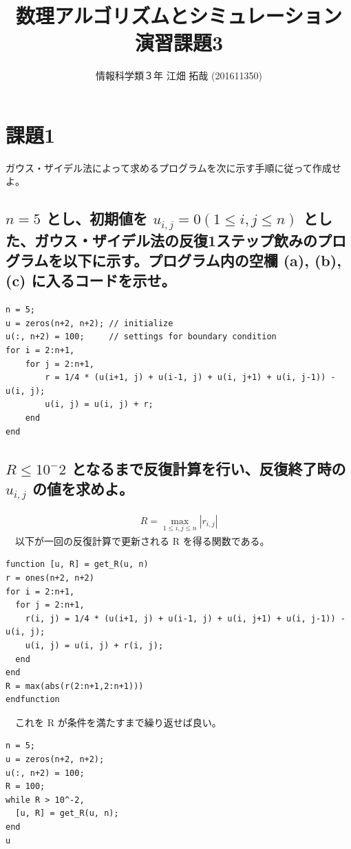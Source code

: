 \documentclass{scrartcl}
\author{情報科学類３年 江畑 拓哉 (201611350)}
\date{}
\title{数理アルゴリズムとシミュレーション\\\medskip
\large 演習課題3}
\begin{document}
\section{課題1}

\label{sec:org79d9556}
ガウス・ザイデル法によって求めるプログラムを次に示す手順に従って作成せよ。\\
\subsection{\(n = 5\) とし、初期値を \(u_{i, j} = 0(1 \leq i, j \leq n)\) とした、ガウス・ザイデル法の反復1ステップ飲みのプログラムを以下に示す。プログラム内の空欄 (a), (b), (c) に入るコードを示せ。}
\label{sec:orgfe8f55b}
\begin{verbatim}
n = 5;
u = zeros(n+2, n+2); // initialize
u(:, n+2) = 100;     // settings for boundary condition
for i = 2:n+1,
    for j = 2:n+1,
        r = 1/4 * (u(i+1, j) + u(i-1, j) + u(i, j+1) + u(i, j-1)) - u(i, j);
        u(i, j) = u(i, j) + r;
    end
end
\end{verbatim}
\subsection{\(R\leq 10^-2\) となるまで反復計算を行い、反復終了時の \(u_{i, j}\) の値を求めよ。}
\label{sec:org7433bb9}
\begin{eqnarray*}
R = \max_{1 \leq i, j \leq n} |r_{i, j}|
\end{eqnarray*}
　以下が一回の反復計算で更新される R を得る関数である。\\
\begin{verbatim}
function [u, R] = get_R(u, n)
r = ones(n+2, n+2)
for i = 2:n+1,
  for j = 2:n+1,
    r(i, j) = 1/4 * (u(i+1, j) + u(i-1, j) + u(i, j+1) + u(i, j-1)) - u(i, j);
    u(i, j) = u(i, j) + r(i, j);
  end
end
R = max(abs(r(2:n+1,2:n+1)))
endfunction
\end{verbatim}
　これを R が条件を満たすまで繰り返せば良い。\\
\begin{verbatim}
n = 5;
u = zeros(n+2, n+2);
u(:, n+2) = 100;
R = 100;
while R > 10^-2,
  [u, R] = get_R(u, n);
end
u
\end{verbatim}
\end{document}
